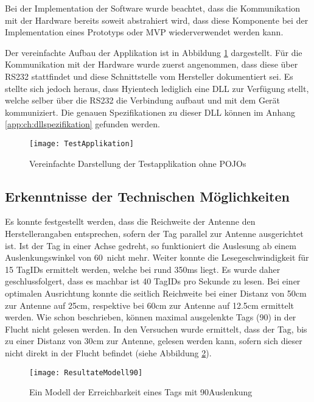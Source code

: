 Bei der Implementation der Software wurde beachtet, dass die Kommunikation mit der Hardware bereits soweit abstrahiert wird, dass diese Komponente bei der Implementation eines Prototyps oder MVP wiederverwendet werden kann.

Der vereinfachte Aufbau der Applikation ist in Abbildung \ref{fig:test_applikation_aufbau} dargestellt. Für die Kommunikation mit der Hardware wurde zuerst angenommen, dass diese über RS232 stattfindet und diese Schnittstelle vom Hersteller dokumentiert sei. Es stellte sich jedoch heraus, dass Hyientech lediglich eine DLL zur Verfügung stellt, welche selber über die RS232 die Verbindung aufbaut und mit dem Gerät kommuniziert. Die genauen Spezifikationen zu dieser DLL können im Anhang \ref{app:ch:dllspezifikation} gefunden werden.

\begin{figure}[htb]
	\centering
	\texttt{[image: TestApplikation]}
	\caption{Vereinfachte Darstellung der Testapplikation ohne POJOs}
	\label{fig:test_applikation_aufbau}
\end{figure}
 
\subsection{Erkenntnisse der Technischen Möglichkeiten}
Es konnte festgestellt werden, dass die Reichweite der Antenne den Herstellerangaben entsprechen, sofern der Tag parallel zur Antenne ausgerichtet ist. Ist der Tag in einer Achse gedreht, so funktioniert die Auslesung ab einem Auslenkungswinkel von 60\SIUnitSymbolDegree\ nicht mehr. Weiter konnte die Lesegeschwindigkeit für 15 TagIDs ermittelt werden, welche bei rund 350ms liegt. Es wurde daher geschlussfolgert, dass es machbar ist 40 TagIDs pro Sekunde zu lesen.
Bei einer optimalen Ausrichtung konnte die seitlich Reichweite bei einer Distanz von 50cm zur Antenne auf 25cm, respektive bei 60cm zur Antenne auf 12.5cm ermittelt werden. Wie schon beschrieben, können maximal ausgelenkte Tags (90\SIUnitSymbolDegree) in der Flucht nicht gelesen werden. In den Versuchen wurde ermittelt, dass der Tag, bis zu einer Distanz von 30cm zur Antenne, gelesen werden kann, sofern sich dieser nicht direkt in der Flucht befindet (siehe Abbildung \ref{fig:Seitlich90}).

\begin{figure}[htb]
	\centering
	\texttt{[image: ResultateModell90]}
	\caption{Ein Modell der Erreichbarkeit eines Tags mit 90\SIUnitSymbolDegree Auslenkung}
	\label{fig:Seitlich90}
\end{figure}

